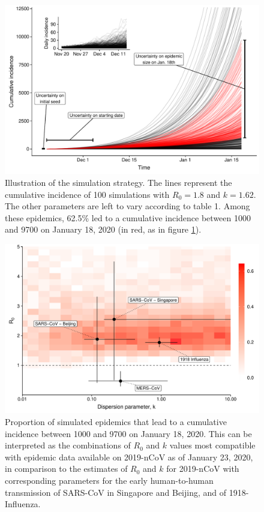 \documentclass{article}
\begin{document}
\begin{figure}[h]
	\centering
	\includegraphics[width=.9\linewidth]{../figure/fig3b.pdf}
	\caption{Illustration of the simulation strategy. The lines represent the cumulative incidence of 100 simulations with $R_0=1.8$ and $k=1.62$. The other parameters are left to vary according to table 1. Among these epidemics, 62.5\% led to a cumulative incidence between 1000 and 9700 on January 18, 2020 (in red, as in figure \ref{fig:fig3}).}
	\label{fig:fig3}
\end{figure}


\begin{figure}[h]
	\centering
	\includegraphics[width=.9\linewidth]{../figure/fig1.pdf}
	\caption{Proportion of simulated epidemics that lead to a cumulative incidence between 1000 and 9700 on January 18, 2020. This can be interpreted as the combinations of $R_0$ and $k$ values most compatible with epidemic data available on 2019-nCoV as of January 23, 2020, in comparison to the estimates of $R_0$ and $k$ for 2019-nCoV with corresponding parameters for the early human-to-human transmission of SARS-CoV in Singapore and Beijing, and of 1918-Influenza.\cite{Lloyd-Smith:2005,Fraser:2011,Kucharski:2015b}
	}
	\label{fig:fig1}
\end{figure}
\end{document}
